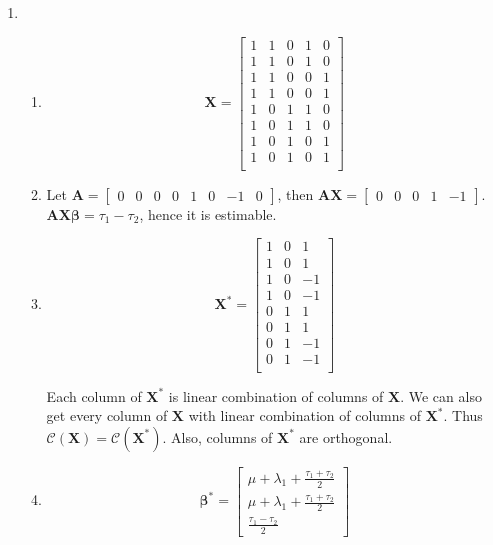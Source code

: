 \documentclass{article}
\begin{document}
\begin{enumerate}[leftmargin = 0 em, label = \arabic*., font = \bfseries]
	\item 
	\begin{enumerate}
		\item 
	
	\[\bm X = \begin{bmatrix}
		1 & 1 & 0 & 1 & 0\\
		1 & 1 & 0 & 1 & 0\\
		1 & 1 & 0 & 0 & 1\\
		1 & 1 & 0 & 0 & 1\\
		1 & 0 & 1 & 1 & 0\\
		1 & 0 & 1 & 1 & 0\\
		1 & 0 & 1 & 0 & 1\\
		1 & 0 & 1 & 0 & 1\\
	\end{bmatrix}\]

	\item 
	Let $\bm A = \begin{bmatrix}
		0 & 0 & 0 & 0 & 1 & 0 & -1 & 0
	\end{bmatrix}$, then $\bm A \bm X = \begin{bmatrix}
		0 & 0 & 0 & 1 & -1
	\end{bmatrix}$. $\bm A \bm X \bm \beta = \tau_1 - \tau_2$, hence it is estimable.
	
	\item 
	\[\bm X^* = \begin{bmatrix}
		1 & 0 & 1\\
		1 & 0 & 1\\
		1 & 0 & -1\\
		1 & 0 & -1\\
		0 & 1 & 1\\
		0 & 1 & 1\\
		0 & 1 & -1\\
		0 & 1 & -1\\
	\end{bmatrix}\]

	Each column of $\bm X^*$ is linear combination of columns of $\bm X$. We can also get every column of $\bm X$ with linear combination of columns of $\bm X^*$. Thus $\mathcal{C}(\bm X) = \mathcal{C}(\bm X^*)$. Also, columns of $\bm X^*$ are orthogonal.

	\item 
	\[\bm \beta^* = \begin{bmatrix}
		\mu + \lambda_1 + \frac{\tau_1 + \tau_2}{2}\\
		\mu + \lambda_1 + \frac{\tau_1 + \tau_2}{2}\\
		\frac{\tau_1 - \tau_2}{2}
	\end{bmatrix}\]


\end{enumerate}
\end{enumerate}
\end{document}
